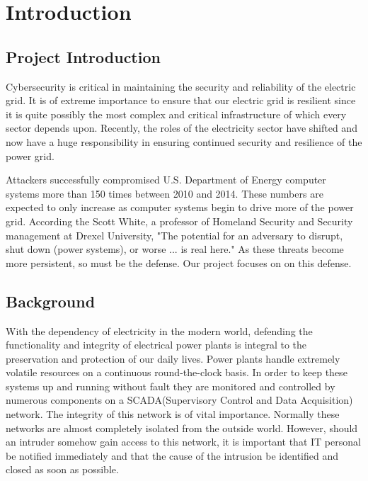 \chapter{Introduction}

\section{Project Introduction}

Cybersecurity is critical in maintaining the security and reliability of the electric grid. It is of extreme importance to ensure that our electric grid is resilient since it is quite possibly the most complex and critical infrastructure of which every sector depends upon. Recently, the roles of the electricity sector have shifted and now have a huge responsibility in ensuring continued security and resilience of the power grid. 

Attackers successfully compromised U.S. Department of Energy computer systems more than 150 times between 2010 and 2014. These numbers are expected to only increase as computer systems begin to drive more of the power grid. According the Scott White, a professor of Homeland Security and Security management at Drexel University, "The potential for an adversary to disrupt, shut down (power systems), or worse ... is real here." As these threats become more persistent, so must be the defense. Our project focuses on on this defense. 

\section{Background}
With the dependency of electricity in the modern world, defending the functionality and integrity of electrical power plants is integral to the preservation and protection of our daily lives. Power plants handle extremely volatile resources on a continuous round-the-clock basis. In order to keep these systems up and running without fault they are monitored and controlled by numerous components on a SCADA(Supervisory Control and Data Acquisition) network. The integrity of this network is of vital importance. Normally these networks are almost completely isolated from the outside world. However, should an intruder somehow gain access to this network, it is important that IT personal be notified immediately and that the cause of the intrusion be identified and closed as soon as possible.


